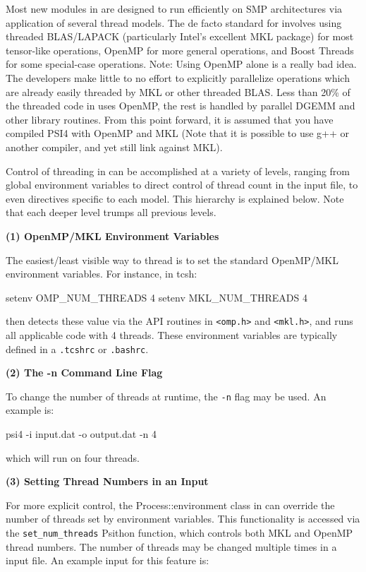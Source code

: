 Most new modules in \PSIfour are designed to run efficiently on SMP architectures
via application of several thread models. The de facto standard for \PSIfour 
involves using threaded BLAS/LAPACK (particularly Intel's excellent MKL package)
for most tensor-like operations, OpenMP for more general operations, and Boost
Threads for some special-case operations. Note: Using OpenMP alone is a really
bad idea. The developers make little to no effort to explicitly parallelize
operations which are already easily threaded by MKL or other threaded BLAS. Less
than 20\% of the threaded code in \PSIfour uses OpenMP, the rest is handled by
parallel DGEMM and other library routines. From this point forward, it is
assumed that you have compiled PSI4 with OpenMP and MKL (Note that it is
possible to use g++ or another compiler, and yet still link against MKL).

Control of threading in \PSIfour can be accomplished at a variety of levels,
ranging from global environment variables to direct control of thread count in
the input file, to even directives specific to each model. This hierarchy is
explained below. Note that each deeper level trumps all previous levels. 

\flushleft \textbf{(1) OpenMP/MKL Environment Variables}

The easiest/least visible way to thread \PSIfour is to set the standard OpenMP/MKL
environment variables. For instance, in tcsh:
\begin{Snippet}
setenv OMP_NUM_THREADS 4
setenv MKL_NUM_THREADS 4
\end{Snippet}
\PSIfour then detects these value via the API routines in \texttt{<omp.h>} and
\texttt{<mkl.h>}, and runs all applicable code with 4 threads. These environment
variables are typically defined in a \texttt{.tcshrc} or \texttt{.bashrc}.  

\flushleft \textbf{(2) The -n Command Line Flag}

To change the number of threads at runtime, the \texttt{-n} flag may be used. An
example is:
\begin{Snippet}
psi4 -i input.dat -o output.dat -n 4 
\end{Snippet}
which will run on four threads.

\flushleft \textbf{(3) Setting Thread Numbers in an Input}

For more explicit control, the Process::environment class in \PSIfour can
override the number of threads set by environment variables. This functionality
is accessed via the \texttt{set\_num\_threads} Psithon function, which controls
both MKL and OpenMP thread numbers. The number of threads may be changed
multiple times in a \PSIfour input file. An example input for this feature is:

